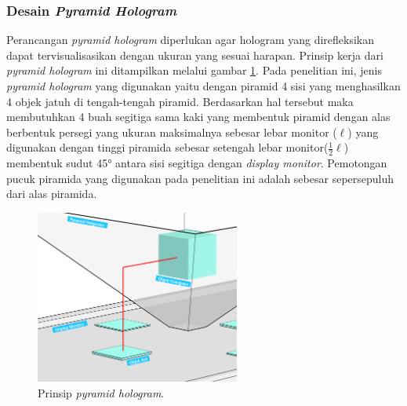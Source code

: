 		\subsubsection{Desain \textit{Pyramid Hologram}}
		\vspace{0.5ex}
			Perancangan \textit{pyramid hologram} diperlukan agar hologram yang direfleksikan dapat tervisualisasikan dengan ukuran yang sesuai harapan. Prinsip kerja dari \textit{pyramid hologram} ini ditampilkan melalui gambar \ref{fig:prinsip_piramid}. Pada penelitian ini, jenis \textit{pyramid hologram} yang digunakan yaitu dengan piramid 4 sisi yang menghasilkan 4 objek jatuh di tengah-tengah piramid. Berdasarkan hal tersebut maka membutuhkan 4 buah segitiga sama kaki yang membentuk piramid dengan alas berbentuk persegi yang ukuran maksimalnya sebesar lebar monitor ($\ell$) yang digunakan dengan tinggi piramida sebesar setengah lebar monitor($\frac{1}{2}\ell$) membentuk sudut 45° antara sisi segitiga dengan \textit{display monitor}. Pemotongan pucuk piramida yang digunakan pada penelitian ini adalah sebesar sepersepuluh dari alas piramida.
			\begin{figure} [H]
				\includegraphics[width=0.6\textwidth]{img/bab3/prinsip_piramid.png}
				\caption{Prinsip \textit{pyramid hologram}.}
				\label{fig:prinsip_piramid}
			\end{figure}
			\vspace{-2ex}
			

